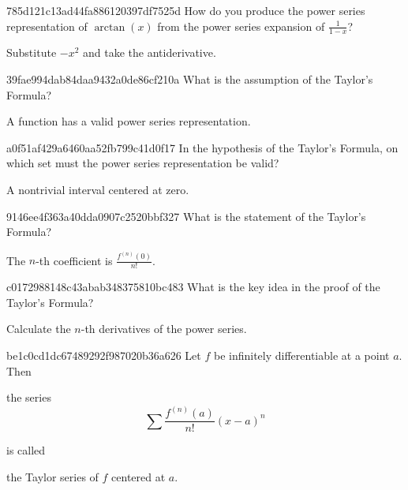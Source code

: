 \begin{note}{785d121c13ad44fa886120397df7525d}
    How do you produce the power series representation of \({ \arctan(x) }\) from the power series expansion of \({ \frac{1}{1-x} }\)?

    \begin{cloze}{1}
        Substitute \({ -x^2 }\) and take the antiderivative.
    \end{cloze}
\end{note}

\begin{note}{39fae994dab84daa9432a0de86cf210a}
    What is the assumption of the Taylor's Formula?

    \begin{cloze}{1}
        A function has a valid power series representation.
    \end{cloze}
\end{note}

\begin{note}{a0f51af429a6460aa52fb799c41d0f17}
    In the hypothesis of the Taylor's Formula, on which set must the power series representation be valid?

    \begin{cloze}{1}
        A nontrivial interval centered at zero.
    \end{cloze}
\end{note}

\begin{note}{9146ee4f363a40dda0907c2520bbf327}
    What is the statement of the Taylor's Formula?

    \begin{cloze}{1}
        The \({ n }\)-th coefficient is \({ \frac{f^{(n)}(0)}{n!} }\).
    \end{cloze}
\end{note}

\begin{note}{c0172988148c43abab348375810bc483}
    What is the key idea in the proof of the Taylor's Formula?

    \begin{cloze}{1}
        Calculate the \({ n }\)-th derivatives of the power series.
    \end{cloze}
\end{note}

\begin{note}{be1c0cd1dc67489292f987020b36a626}
    Let \({ f }\) be infinitely differentiable at a point \({ a }\).
    Then
    \begin{icloze}{2}
        the series
        \[
            \sum \frac{f^{(n)}(a)}{n!} (x - a)^{n}
        \]
    \end{icloze}
    is called \begin{icloze}{1}the Taylor series of \({ f }\) centered at \({ a }\).\end{icloze}
\end{note}

